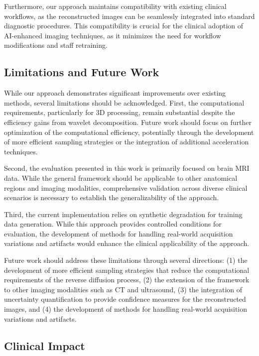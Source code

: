 \documentclass{midl} %
\begin{document}
Furthermore, our approach maintains compatibility with existing clinical workflows, as the reconstructed images can be seamlessly integrated into standard diagnostic procedures. This compatibility is crucial for the clinical adoption of AI-enhanced imaging techniques, as it minimizes the need for workflow modifications and staff retraining.

\subsection{Limitations and Future Work}

While our approach demonstrates significant improvements over existing methods, several limitations should be acknowledged. First, the computational requirements, particularly for 3D processing, remain substantial despite the efficiency gains from wavelet decomposition. Future work should focus on further optimization of the computational efficiency, potentially through the development of more efficient sampling strategies or the integration of additional acceleration techniques.

Second, the evaluation presented in this work is primarily focused on brain MRI data. While the general framework should be applicable to other anatomical regions and imaging modalities, comprehensive validation across diverse clinical scenarios is necessary to establish the generalizability of the approach.

Third, the current implementation relies on synthetic degradation for training data generation. While this approach provides controlled conditions for evaluation, the development of methods for handling real-world acquisition variations and artifacts would enhance the clinical applicability of the approach.

Future work should address these limitations through several directions: (1) the development of more efficient sampling strategies that reduce the computational requirements of the reverse diffusion process, (2) the extension of the framework to other imaging modalities such as CT and ultrasound, (3) the integration of uncertainty quantification to provide confidence measures for the reconstructed images, and (4) the development of methods for handling real-world acquisition variations and artifacts.

\subsection{Clinical Impact}
\end{document}
